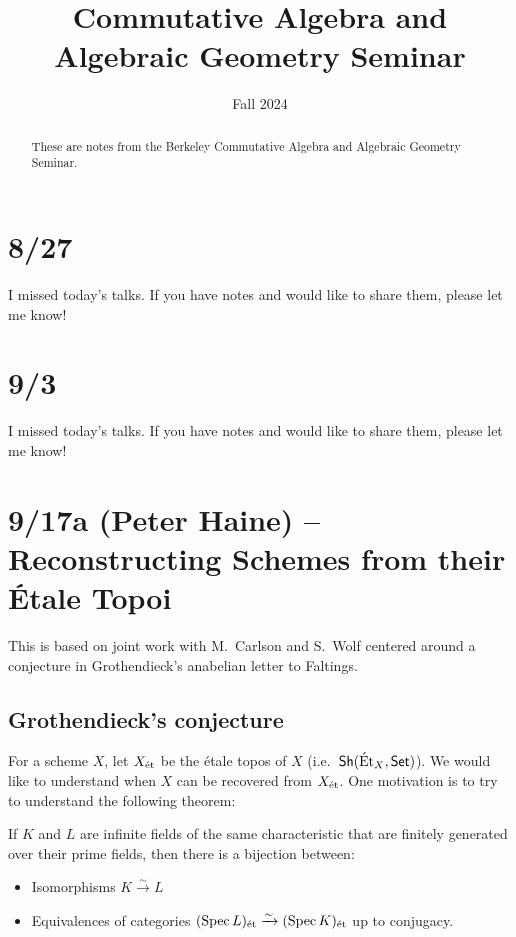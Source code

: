 \documentclass{amsart}
\title{Commutative Algebra and Algebraic Geometry Seminar}
\date{Fall 2024}
\begin{document}
\begin{abstract}
	These are notes from the Berkeley Commutative Algebra and Algebraic Geometry Seminar.
\end{abstract}

\maketitle

\tableofcontents

\section{8/27}

I missed today's talks.
If you have notes and would like to share them, please let me know!

\section{9/3}

I missed today's talks.
If you have notes and would like to share them, please let me know!

\section{9/17a (Peter Haine) -- Reconstructing Schemes from their \'Etale Topoi}

This is based on joint work with M.\ Carlson and S.\ Wolf centered around a conjecture in Grothendieck's anabelian letter to Faltings.

\subsection{Grothendieck's conjecture}

For a scheme $X$, let $X_{\mathrm{\acute{e}t}}$ be the \'etale topos of $X$ (i.e.\ $\mathsf{Sh}(\mathrm{\acute{E}t}_X, \mathsf{Set})$).
We would like to understand when $X$ can be recovered from $X_{\mathrm{\acute{e}t}}$.
One motivation is to try to understand the following theorem:

\begin{thm}
	If $K$ and $L$ are infinite fields of the same characteristic that are finitely generated over their prime fields, then there is a bijection between:
	\begin{itemize}
		\item Isomorphisms $K \xrightarrow{\sim} L$
		\item Equivalences of categories $(\operatorname{Spec} L)_{\mathrm{\acute{e}t}} \xrightarrow{\sim} (\operatorname{Spec} K)_{\mathrm{\acute{e}t}}$ up to conjugacy.
	\end{itemize}
\end{thm}
\end{document}
